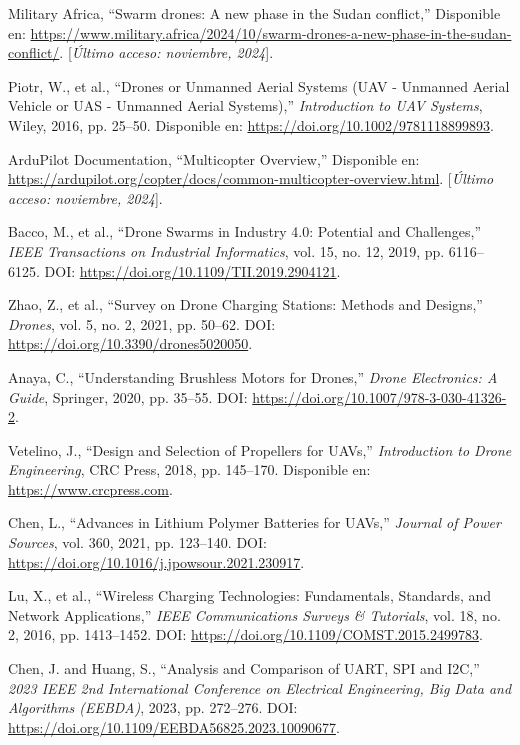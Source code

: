 \begin{thebibliography}{30}
    Military Africa, ``Swarm drones: A new phase in the Sudan conflict,'' Disponible en: \url{https://www.military.africa/2024/10/swarm-drones-a-new-phase-in-the-sudan-conflict/}. [\textit{Último acceso: noviembre, 2024}].

    Piotr, W., et al., ``Drones or Unmanned Aerial Systems (UAV - Unmanned Aerial Vehicle or UAS - Unmanned Aerial Systems),'' \textit{Introduction to UAV Systems}, Wiley, 2016, pp. 25--50. Disponible en: \url{https://doi.org/10.1002/9781118899893}.

    ArduPilot Documentation, ``Multicopter Overview,'' Disponible en: \url{https://ardupilot.org/copter/docs/common-multicopter-overview.html}. [\textit{Último acceso: noviembre, 2024}].

    Bacco, M., et al., ``Drone Swarms in Industry 4.0: Potential and Challenges,'' \textit{IEEE Transactions on Industrial Informatics}, vol. 15, no. 12, 2019, pp. 6116--6125. DOI: \url{https://doi.org/10.1109/TII.2019.2904121}.

    Zhao, Z., et al., ``Survey on Drone Charging Stations: Methods and Designs,'' \textit{Drones}, vol. 5, no. 2, 2021, pp. 50--62. DOI: \url{https://doi.org/10.3390/drones5020050}.

    Anaya, C., ``Understanding Brushless Motors for Drones,'' \textit{Drone Electronics: A Guide}, Springer, 2020, pp. 35--55. DOI: \url{https://doi.org/10.1007/978-3-030-41326-2}.

    Vetelino, J., ``Design and Selection of Propellers for UAVs,'' \textit{Introduction to Drone Engineering}, CRC Press, 2018, pp. 145--170. Disponible en: \url{https://www.crcpress.com}.

    Chen, L., ``Advances in Lithium Polymer Batteries for UAVs,'' \textit{Journal of Power Sources}, vol. 360, 2021, pp. 123--140. DOI: \url{https://doi.org/10.1016/j.jpowsour.2021.230917}.

    Lu, X., et al., ``Wireless Charging Technologies: Fundamentals, Standards, and Network Applications,'' \textit{IEEE Communications Surveys \& Tutorials}, vol. 18, no. 2, 2016, pp. 1413--1452. DOI: \url{https://doi.org/10.1109/COMST.2015.2499783}.

    Chen, J. and Huang, S., ``Analysis and Comparison of UART, SPI and I2C,'' \textit{2023 IEEE 2nd International Conference on Electrical Engineering, Big Data and Algorithms (EEBDA)}, 2023, pp. 272--276. DOI: \url{https://doi.org/10.1109/EEBDA56825.2023.10090677}.


\end{thebibliography}

